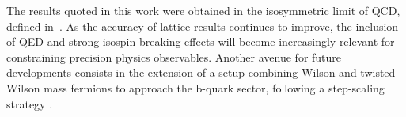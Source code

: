 The results quoted in this work were obtained in the isosymmetric limit of QCD, defined in~\citep{FlavourLatticeAveragingGroupFLAG:2021npn}. As the accuracy of lattice results continues to improve, the inclusion of QED and strong isospin breaking effects will become increasingly relevant for constraining precision physics observables. Another avenue for future developments consists in the extension of a setup combining Wilson and twisted Wilson mass fermions to approach  the b-quark sector, following a step-scaling strategy \cite{Sommer:2023gap}.


